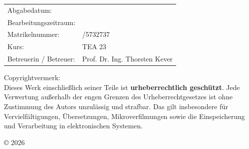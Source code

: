 \documentclass[a4paper,12pt]{scrartcl}
\begin{document}
\begin{titlepage}
		\begin{flushleft}
			{\fontsize{12pt}{14pt}\selectfont
				\begin{tabular}{ll}
					Abgabedatum:					& \quad  \\
					Bearbeitungszeitraum:		   	& \quad     \\ 
					Matrikelnummer: 			& \quad 3960407/5732737 \\ 
					Kurs: 							& \quad TEA 23 \\
					Betreuerin / Betreuer:  & \quad Prof. Dr. Ing. Thorsten Kever \\ %
				\end{tabular}
			}
		\end{flushleft}
		\begin{flushleft}
			{\fontsize{11pt}{13pt}\selectfont
				Copyrightvermerk:\\
				Dieses Werk einschließlich seiner Teile ist \textbf{urheberrechtlich geschützt}. Jede Verwertung außerhalb der engen Grenzen des Urheberrechtgesetzes ist ohne Zustimmung des Autors unzulässig und strafbar. Das gilt insbesondere für Vervielfältigungen, Übersetzungen, Mikroverfilmungen sowie die Einspeicherung und Verarbeitung in elektronischen Systemen.
			}
		\end{flushleft}
		\begin{flushright}
			{\fontsize{11pt}{13pt}\selectfont \copyright{} 2026 }
		\end{flushright}
	\end{titlepage}
	
	\clearpage
	\tableofcontents
	\clearpage	
	\setcounter{page}{1}
	
	
	
	
	\newpage
	\printbibliography
\end{document}
